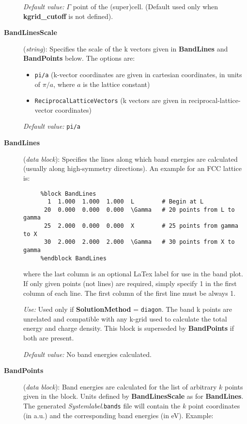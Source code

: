 \documentclass[11pt]{article}
\begin{document}
\begin{description}
{\it Default value:} $\Gamma$ point of the (super)cell.
(Default used only when {\bf kgrid\_cutoff} is not defined).
        

\item[{\bf BandLinesScale}] ({\it string}): 
Specifies the scale of the k vectors given in {\bf BandLines} 
and {\bf BandPoints} below.
The options are:
\begin{itemize}
\item {\tt pi/a} (k-vector coordinates are given in cartesian 
coordinates, in units of $\pi/a$, where $a$ is the lattice constant)
\item {\tt ReciprocalLatticeVectors} (k vectors are given in
reciprocal-lattice-vector coordinates)
\end{itemize}

{\it Default value:} {\tt pi/a}


\item[{\bf BandLines}] ({\it data block}): 
Specifies the lines along which band energies are calculated
(usually along high-symmetry directions).
An example for an FCC lattice is:

\begin{verbatim}
     %block BandLines
       1  1.000  1.000  1.000  L        # Begin at L
      20  0.000  0.000  0.000  \Gamma   # 20 points from L to gamma
      25  2.000  0.000  0.000  X        # 25 points from gamma to X
      30  2.000  2.000  2.000  \Gamma   # 30 points from X to gamma
     %endblock BandLines
\end{verbatim}

where the last column is an optional LaTex label for use in the band plot.
If only given points (not lines) are required, simply specify 1 in the
first column of each line. The first column of the first line must be 
always 1.

{\it Use:} Used only if {\bf SolutionMethod} = {\tt diagon}.
The band k points are unrelated and compatible with any k-grid used
to calculate the total energy and charge density.
This block is superseded by {\bf BandPoints} if both are present.

{\it Default value:} No band energies calculated.

\item[{\bf BandPoints}] ({\it data block}): 
Band energies are calculated for the list of arbitrary $k$ points 
given in the block. Units defined by {\bf BandLinesScale} as 
for {\bf BandLines}. The generated {\it Systemlabel}.{\tt bands} file
will contain the $k$ point coordinates (in a.u.) and the corresponding
band energies (in eV). Example:


\end{description}
\end{document}
